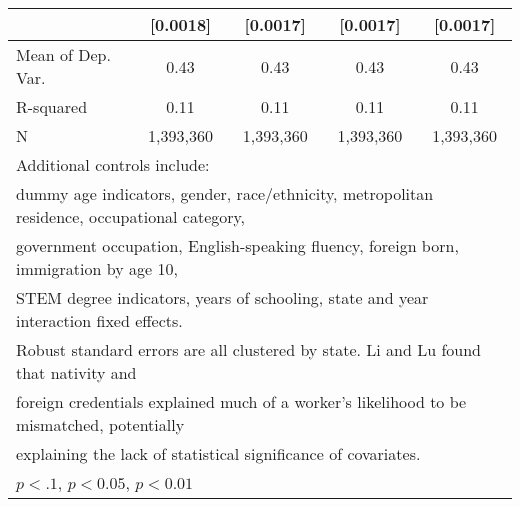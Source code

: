 \begin{table}[htbp]
\begin{tabular}{l*{4}{c}}
                    &    [0.0018]         &    [0.0017]         &    [0.0017]         &    [0.0017]         \\
\midrule
Mean of Dep. Var.   &        0.43         &        0.43         &        0.43         &        0.43         \\
R-squared           &        0.11         &        0.11         &        0.11         &        0.11         \\
N                   &   1,393,360         &   1,393,360         &   1,393,360         &   1,393,360         \\
\bottomrule
\multicolumn{5}{l}{\footnotesize Additional controls include:}\\
\multicolumn{5}{l}{\footnotesize dummy age indicators, gender, race/ethnicity, metropolitan residence, occupational category,}\\
\multicolumn{5}{l}{\footnotesize government occupation, English-speaking fluency, foreign born, immigration by age 10,}\\
\multicolumn{5}{l}{\footnotesize STEM degree indicators, years of schooling, state and year interaction fixed effects.}\\
\multicolumn{5}{l}{\footnotesize Robust standard errors are all clustered by state. Li and Lu found that nativity and}\\
\multicolumn{5}{l}{\footnotesize foreign credentials explained much of a worker's likelihood to be mismatched, potentially}\\
\multicolumn{5}{l}{\footnotesize explaining the lack of statistical significance of covariates.}\\
\multicolumn{5}{l}{\footnotesize \sym{*} \(p<.1\), \sym{**} \(p<0.05\), \sym{***} \(p<0.01\)}\\
\end{tabular}
\end{table}
